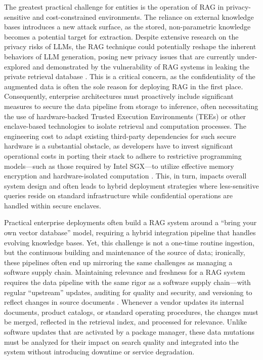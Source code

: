 \documentclass[11pt]{article}
\begin{document}
The greatest practical challenge for entities is the operation of RAG in privacy-sensitive and cost-constrained environments. The reliance on external knowledge bases introduces a new attack surface, as the stored, non-parametric knowledge becomes a potential target for extraction. Despite extensive research on the privacy risks of LLMs, the RAG technique could potentially reshape the inherent behaviors of LLM generation, posing new privacy issues that are currently under-explored and demonstrated by the vulnerability of RAG systems in leaking the private retrieval database \cite{ref221,ref222}. This is a critical concern, as the confidentiality of the augmented data is often the sole reason for deploying RAG in the first place. Consequently, enterprise architectures must proactively include significant measures to secure the data pipeline from storage to inference, often necessitating the use of hardware-backed Trusted Execution Environments (TEEs) or other enclave-based technologies to isolate retrieval and computation processes. The engineering cost to adapt existing third-party dependencies for such secure hardware is a substantial obstacle, as developers have to invest significant operational costs in porting their stack to adhere to restrictive programming models---such as those required by Intel SGX---to utilize effective memory encryption and hardware-isolated computation \cite{ref223}. This, in turn, impacts overall system design and often leads to hybrid deployment strategies where less-sensitive queries reside on standard infrastructure while confidential operations are handled within secure enclaves.

Practical enterprise deployments often build a RAG system around a ``bring your own vector database'' model, requiring a hybrid integration pipeline that handles evolving knowledge bases. Yet, this challenge is not a one-time routine ingestion, but the continuous building and maintenance of the source of data; ironically, these pipelines often end up mirroring the same challenges as managing a software supply chain. Maintaining relevance and freshness for a RAG system requires the data pipeline with the same rigor as a software supply chain---with regular ``upstream'' updates, auditing for quality and security, and versioning to reflect changes in source documents \cite{ref223}. Whenever a vendor updates its internal documents, product catalogs, or standard operating procedures, the changes must be merged, reflected in the retrieval index, and processed for relevance. Unlike software updates that are activated by a package manager, these data mutations must be analyzed for their impact on search quality and integrated into the system without introducing downtime or service degradation.
\end{document}
